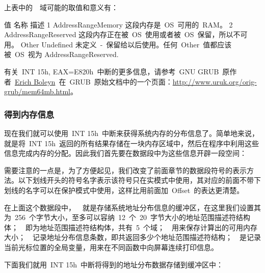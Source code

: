 上表中的~~域可能的取值和意义有：
\begin{Command}
值      名称                     描述
1       AddressRangeMemory      这段内存是~OS~可用的~RAM。
2       AddressRangeReserved    这段内存正在被~OS~使用或者被~OS~保留，所以不可用。
Other   Undefined               未定义~-~保留给以后使用。任何~Other~值都应该被~OS~视为                                          AddressRangeReserved.
\end{Command}

有关~INT 15h, EAX=E820h~中断的更多信息，请参考~GNU GRUB~原作者~\href{http://www.uruk.org/~erich/}{Erich Boleyn}~在~GRUB~原始文档中的一个页面：\url{http://www.uruk.org/orig-grub/mem64mb.html}。

\subsubsection{得到内存信息}

现在我们就可以使用~INT 15h~中断来获得系统内存的分布信息了。简单地来说，就是将~INT 15h~返回的所有结果存储在一块内存区域中，然后在程序中利用这些信息完成内存的分配。因此我们首先要在数据段中为这些信息开辟一段空间：


需要注意的一点是，为了方便起见，我们改变了前面章节的数据段符号的表示方法。以下划线开头的符号名字表示该符号只在实模式中使用，其对应的前面不带下划线的名字可以在保护模式中使用，这样比用前面加~Offset~的表达更清楚。

在上面这个数据段中，~~就是存储系统地址分布信息的缓冲区，在这里我们设置其为~256~个字节大小，至多可以容纳~12~个~20~字节大小的地址范围描述符结构体；~~即为地址范围描述符结构体，共有~5~个域；~~用来保存计算出的可用内存大小；~~记录地址分布信息条数，即共返回多少个地址范围描述符结构；~~是记录当前光标位置的全局变量，用来在不同函数中向屏幕连续打印信息。

下面我们就用~INT 15h~中断将得到的地址分布数据存储到缓冲区中：


